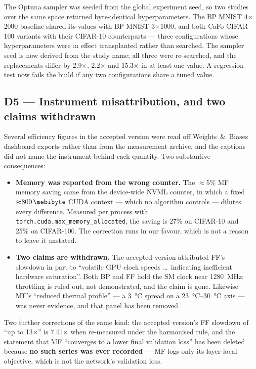 \documentclass[11pt,a4paper]{article}
\newcommand{\tmma}{\texttt{torch.cuda.\allowbreak max\_memory\_\allowbreak allocated}}
\newcommand{\FF}{FF}
\newcommand{\MF}{MF}
\newcommand{\BP}{BP}
\newcommand{\CaFo}{CaFo}
\begin{document}
The Optuna sampler was seeded from the global experiment seed, so two studies
over the same space returned byte-identical hyperparameters. The \BP{} MNIST
4$\times$2000 baseline shared its values with \BP{} MNIST 3$\times$1000, and
both \CaFo{} CIFAR-100 variants with their CIFAR-10 counterparts --- three
configurations whose hyperparameters were in effect transplanted rather than
searched. The sampler seed is now derived from the study name; all three were
re-searched, and the replacements differ by \num{2.9}$\times$,
\num{2.2}$\times$ and \num{15.3}$\times$ in at least one value. A regression
test now fails the build if any two configurations share a tuned value.

\subsection*{D5 --- Instrument misattribution, and two claims withdrawn}

Several efficiency figures in the accepted version were read off
Weights~\&~Biases dashboard exports rather than from the measurement archive,
and the captions did not name the instrument behind each quantity. Two
substantive consequences:

\begin{itemize}[nosep,leftmargin=1.4em]
  \item \textbf{Memory was reported from the wrong counter.} The
        ${\approx}\num{5}\%$ \MF{} memory saving came from the device-wide NVML
        counter, in which a fixed ${\approx}\SI{800}{\mebibyte}$ CUDA context
        --- which no algorithm controls --- dilutes every difference. Measured
        per process with \tmma{}, the
        saving is \num{27}\% on CIFAR-10 and \num{25}\% on CIFAR-100. The
        correction runs in our favour, which is not a reason to leave it
        unstated.
  \item \textbf{Two claims are withdrawn.} The accepted version attributed
        \FF{}'s slowdown in part to ``volatile GPU clock speeds \dots\
        indicating inefficient hardware saturation''. Both \BP{} and \FF{}
        hold the SM clock near \SI{1280}{\mega\hertz}; throttling is ruled
        out, not demonstrated, and the claim is gone. Likewise \MF{}'s
        ``reduced thermal profile'' --- a \SI{3}{\celsius} spread on a
        \SIrange{23}{30}{\celsius} axis --- was never evidence, and that panel
        has been removed.
\end{itemize}

\noindent
Two further corrections of the same kind: the accepted version's \FF{}
slowdown of ``up to \num{13}$\times$'' is \num{7.41}$\times$ when re-measured
under the harmonised rule, and the statement that \MF{} ``converges to a lower
final validation loss'' has been deleted because \textbf{no such series was
ever recorded} --- \MF{} logs only its layer-local objective, which is not the
network's validation loss.
\end{document}
